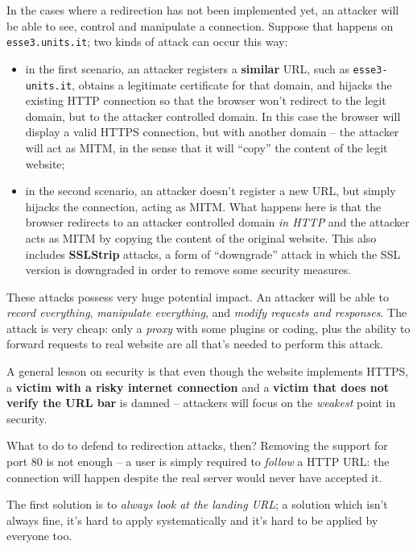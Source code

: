 \documentclass[10pt]{extbook}
\begin{document}
In the cases where a redirection has not been implemented yet, an attacker will
be able to see, control and manipulate a connection. Suppose that happens on
\texttt{esse3.\-units.it}; two kinds of attack can occur this way:
\begin{itemize}
    \item in the first scenario, an attacker registers a \textbf{similar} URL,
        such as \texttt{esse3\--units.it}, obtains a legitimate certificate for
        that domain, and hijacks the existing HTTP connection so that the
        browser won't redirect to the legit domain, but to the attacker
        controlled domain. In this case the browser will display a valid HTTPS
        connection, but with another domain -- the attacker will act as MITM,
        in the sense that it will ``copy'' the content of the legit website;
    \item in the second scenario, an attacker doesn't register a new URL, but
        simply hijacks the connection, acting as MITM. What happens here is
        that the browser redirects to an attacker controlled domain \emph{in
        HTTP} and the attacker acts as MITM by copying the content of the
        original website. This also includes \textbf{SSLStrip} attacks, a form
        of ``downgrade'' attack in which the SSL version is downgraded in order
        to remove some security measures.
\end{itemize}

These attacks possess very huge potential impact. An attacker will be able to
\emph{record everything}, \emph{manipulate everything}, and \emph{modify
requests and responses}. The attack is very cheap: only a \emph{proxy} with
some plugins or coding, plus the ability to forward requests to real website
are all that's needed to perform this attack.

A general lesson on security is that even though the website implements HTTPS,
a \textbf{victim with a risky internet connection} and a \textbf{victim that
does not verify the URL bar} is damned -- attackers will focus on the
\emph{weakest} point in security.

What to do to defend to redirection attacks, then?
Removing the support for port $80$ is not enough -- a user is simply required
to \emph{follow} a HTTP URL: the connection will happen despite the real server
would never have accepted it. 

The first solution is to \emph{always look at the landing URL}; a solution
which isn't always fine, it's hard to apply systematically and it's hard to be
applied by everyone too.
\end{document}
